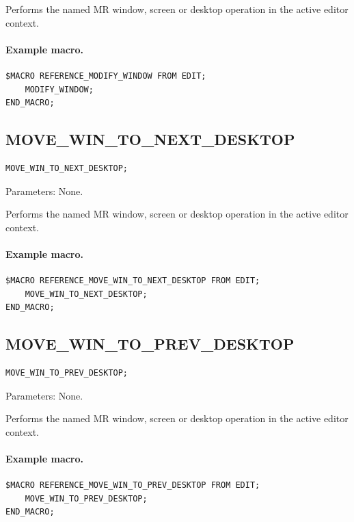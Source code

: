 \documentclass[a4paper,10pt,twoside,openany]{book}
\newenvironment{mrmacextension}{\begin{changebar}}{\end{changebar}}
\begin{document}
Performs the named MR window, screen or desktop operation in the active editor context.

\paragraph{Example macro.}
\begin{verbatim}
$MACRO REFERENCE_MODIFY_WINDOW FROM EDIT;
    MODIFY_WINDOW;
END_MACRO;
\end{verbatim}

\begin{mrmacextension}
\label{prim:procedure-move-win-to-next-desktop}
\subsection*{MOVE\_WIN\_TO\_NEXT\_DESKTOP}
\begin{verbatim}
MOVE_WIN_TO_NEXT_DESKTOP;
\end{verbatim}
Parameters: None.

Performs the named MR window, screen or desktop operation in the active editor context.

\paragraph{Example macro.}
\begin{verbatim}
$MACRO REFERENCE_MOVE_WIN_TO_NEXT_DESKTOP FROM EDIT;
    MOVE_WIN_TO_NEXT_DESKTOP;
END_MACRO;
\end{verbatim}
\end{mrmacextension}

\begin{mrmacextension}
\label{prim:procedure-move-win-to-prev-desktop}
\subsection*{MOVE\_WIN\_TO\_PREV\_DESKTOP}
\begin{verbatim}
MOVE_WIN_TO_PREV_DESKTOP;
\end{verbatim}
Parameters: None.

Performs the named MR window, screen or desktop operation in the active editor context.

\paragraph{Example macro.}
\begin{verbatim}
$MACRO REFERENCE_MOVE_WIN_TO_PREV_DESKTOP FROM EDIT;
    MOVE_WIN_TO_PREV_DESKTOP;
END_MACRO;
\end{verbatim}
\end{mrmacextension}
\end{document}
